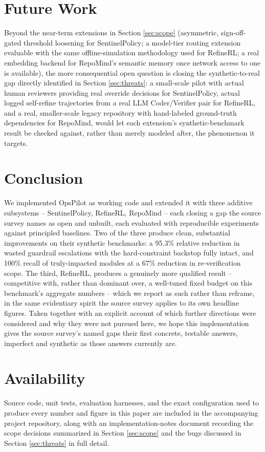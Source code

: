 \documentclass[conference]{IEEEtran}
\begin{document}
\section{Future Work}
\label{sec:future}

Beyond the near-term extensions in Section \ref{sec:scope} (asymmetric,
sign-off-gated threshold loosening for SentinelPolicy; a model-tier routing
extension evaluable with the same offline-simulation methodology used for
RefineRL; a real embedding backend for RepoMind's semantic memory once
network access to one is available), the more consequential open question is
closing the synthetic-to-real gap directly identified in Section
\ref{sec:threats}: a small-scale pilot with actual human reviewers providing
real override decisions for SentinelPolicy, actual logged self-refine
trajectories from a real LLM Coder/Verifier pair for RefineRL, and a real,
smaller-scale legacy repository with hand-labeled ground-truth dependencies
for RepoMind, would let each extension's synthetic-benchmark result be
checked against, rather than merely modeled after, the phenomenon it targets.

\section{Conclusion}
\label{sec:conclusion}

We implemented OpsPilot as working code and extended it with three additive
subsystems -- SentinelPolicy, RefineRL, RepoMind -- each closing a gap the
source survey names as open and unbuilt, each evaluated with reproducible
experiments against principled baselines. Two of the three produce clean,
substantial improvements on their synthetic benchmarks: a 95.3\% relative
reduction in wasted guardrail escalations with the hard-constraint backstop
fully intact, and 100\% recall of truly-impacted modules at a 67\% reduction
in re-verification scope. The third, RefineRL, produces a genuinely more
qualified result -- competitive with, rather than dominant over, a
well-tuned fixed budget on this benchmark's aggregate numbers -- which we
report as such rather than reframe, in the same evidentiary spirit the
source survey applies to its own headline figures. Taken together with an
explicit account of which further directions were considered and why they
were not pursued here, we hope this implementation gives the source survey's
named gaps their first concrete, testable answers, imperfect and synthetic
as those answers currently are.

\section*{Availability}
Source code, unit tests, evaluation harnesses, and the exact configuration
used to produce every number and figure in this paper are included in the
accompanying project repository, along with an implementation-notes document
recording the scope decisions summarized in Section \ref{sec:scope} and the
bugs discussed in Section \ref{sec:threats} in full detail.
\end{document}
